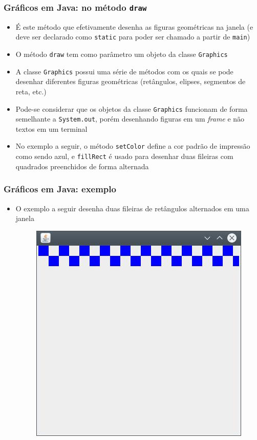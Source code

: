 \documentclass[xcolor={dvipsnames,table},aspectratio=169]{beamer}
\begin{document}
\begin{frame}\frametitle{Gráficos em Java: no método \texttt{draw}}
\begin{itemize}
	\item É este método que efetivamente desenha as figuras geométricas na janela (e deve ser declarado como \texttt{static} para poder ser chamado a partir de \texttt{main})
	\item O método \texttt{draw} tem como parâmetro um objeto da classe \texttt{Graphics}
	\item A classe \texttt{Graphics} possui uma série de métodos com os quais se pode desenhar diferentes figuras geométricas (retângulos, elipses, segmentos de reta, etc.)
	\item Pode-se considerar que os objetos da classe \texttt{Graphics} funcionam de forma semelhante a \texttt{System.out}, porém desenhando figuras em um \emph{frame} e não textos em um terminal
	\item No exemplo a seguir, o método \texttt{setColor} define a cor padrão de impressão como sendo azul, e \texttt{fillRect} é usado para desenhar duas fileiras com quadrados preenchidos de forma alternada
	\end{itemize}
\end{frame}

\begin{frame}\frametitle{Gráficos em Java: exemplo}
\begin{itemize}
	\item O exemplo a seguir desenha duas fileiras de retângulos alternados em uma janela
\begin{figure}[h]	
	\includegraphics[height=0.6\paperheight,center]{pucrs-ep-fprog-unidade_04-lacos-laminas-exemplo.jpg}
\end{figure}
\end{itemize}
\end{frame}
\end{document}
